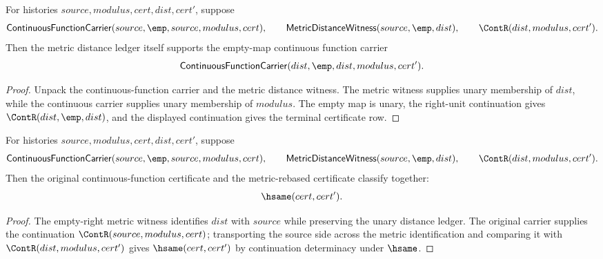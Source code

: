 \begin{theorem}
\label{thm:continuousmap-empty-target-metric-rebased-carrier}
For histories $source,modulus,cert,dist,cert'$, suppose
$$
\mathsf{ContinuousFunctionCarrier}(source,\emp,source,modulus,cert),
\qquad
\mathsf{MetricDistanceWitness}(source,\emp,dist),
\qquad
\ContR(dist,modulus,cert').
$$
Then the metric distance ledger itself supports the empty-map continuous
function carrier
$$
\mathsf{ContinuousFunctionCarrier}(dist,\emp,dist,modulus,cert').
$$
\end{theorem}
\begin{proof}
Unpack the continuous-function carrier and the metric distance witness. The
metric witness supplies unary membership of $dist$, while the continuous
carrier supplies unary membership of $modulus$. The empty map is unary, the
right-unit continuation gives $\ContR(dist,\emp,dist)$, and the displayed
continuation gives the terminal certificate row.
\end{proof}

\begin{theorem}
\label{thm:continuousmap-empty-target-metric-cert-deterministic}
For histories $source,modulus,cert,dist,cert'$, suppose
$$
\mathsf{ContinuousFunctionCarrier}(source,\emp,source,modulus,cert),
\qquad
\mathsf{MetricDistanceWitness}(source,\emp,dist),
\qquad
\ContR(dist,modulus,cert').
$$
Then the original continuous-function certificate and the metric-rebased
certificate classify together:
$$
\hsame(cert,cert').
$$
\end{theorem}
\begin{proof}
The empty-right metric witness identifies $dist$ with $source$ while preserving
the unary distance ledger. The original carrier supplies the continuation
$\ContR(source,modulus,cert)$; transporting the source side across the metric
identification and comparing it with $\ContR(dist,modulus,cert')$ gives
$\hsame(cert,cert')$ by continuation determinacy under $\hsame$.
\end{proof}

